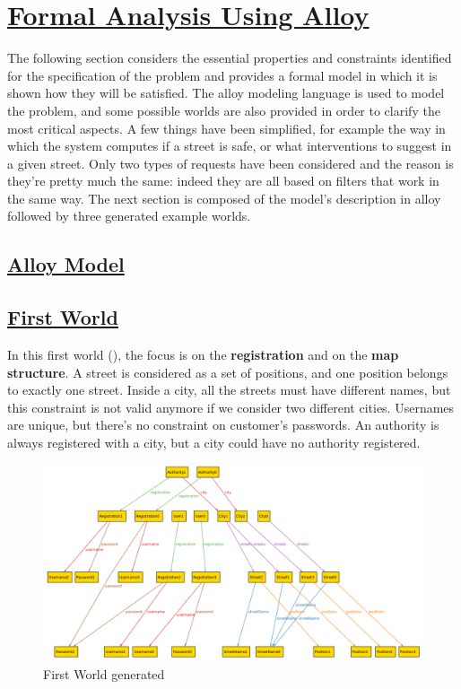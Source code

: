 \section[Formal Analysis Using Alloy]{\hyperlink{toc}{Formal Analysis Using Alloy}}
	\label{sec:formalAnalysisUsingAlloy}
	The following section considers the essential properties and constraints identified for the specification of the problem and provides a formal model in which it is shown how they will be satisfied. The alloy modeling language is used to model the problem, and some possible worlds are also provided in order to clarify the most critical aspects. 
	A few things have been simplified, for example the way in which the system computes if a street is safe, or what interventions to suggest in a given street. Only two types of requests have been considered and the reason is they're pretty much the same: indeed they are all based on filters that work in the same way. The next section is composed of the model's description in alloy followed by three generated example worlds.
	
	\subsection[Alloy Model]{\hyperlink{toc}{Alloy Model}}
	
	
	\subsection[First World]{\hyperlink{toc}{First World}}
	In this first world (), the focus is on the \textbf{registration} and on the \textbf{map structure}. 
	A street is considered as a set of positions, and one position belongs to exactly one street. Inside a city, all the streets must have different names, but this constraint is not valid anymore if we consider two different cities.
	Usernames are unique, but there's no constraint on customer's passwords.
	An authority is always registered with a city, but a city could have no authority registered.
	
	\begin{figure}[h!]
		\centering
		\includegraphics[scale=0.4, angle=90]{Files/alloy/world1.png}
		\caption{\label{fig:firstWorld}First World generated}
	\end{figure}
	
